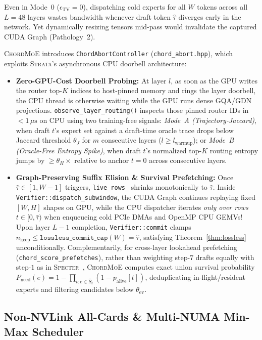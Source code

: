 \documentclass[10pt,twocolumn]{article}
\theoremstyle{definition}
\begin{document}
Even in Mode~0 ($\epsilon_{\mathrm{TV}} = 0$), dispatching cold experts for all $W$ tokens across all $L=48$ layers wastes bandwidth whenever draft token $\hat{\tau}$ diverges early in the network. Yet dynamically resizing tensors mid-pass would invalidate the captured CUDA Graph (Pathology~2).

\textsc{ChordMoE} introduces \texttt{ChordAbortController} (\texttt{chord\_abort.hpp}), which exploits \textsc{Strata}'s asynchronous CPU doorbell architecture:
\begin{itemize}
  \item \textbf{Zero-GPU-Cost Doorbell Probing:} At layer $l$, as soon as the GPU writes the router top-$K$ indices to host-pinned memory and rings the layer doorbell, the CPU thread is otherwise waiting while the GPU runs dense GQA/GDN projections. \texttt{observe\_layer\_routing()} inspects those pinned router IDs in $<\!1\,\mu\text{s}$ on CPU using two training-free signals: \emph{Mode~A (Trajectory-Jaccard)}, when draft $t$'s expert set against a draft-time oracle trace drops below Jaccard threshold $\theta_J$ for $m$ consecutive layers ($l \ge l_{\text{warmup}}$); or \emph{Mode~B (Oracle-Free Entropy Spike)}, when draft $t$'s normalized top-$K$ routing entropy jumps by $\ge \theta_H \times$ relative to anchor $t=0$ across consecutive layers.
  \item \textbf{Graph-Preserving Suffix Elision \& Survival Prefetching:} Once $\hat{\tau} \in [1, W-1]$ triggers, \texttt{live\_rows\_} shrinks monotonically to $\hat{\tau}$. Inside \texttt{Verifier::dispatch\_subwindow}, the CUDA Graph continues replaying fixed $[W, H]$ shapes on GPU, while the CPU dispatcher iterates \emph{only over rows $t \in [0, \hat{\tau})$} when enqueueing cold PCIe DMAs and OpenMP CPU GEMVs! Upon layer $L-1$ completion, \texttt{Verifier::commit} clamps $n_{\text{keep}} \le \texttt{lossless\_commit\_cap}(W) = \hat{\tau}$, satisfying Theorem~\ref{thm:lossless} unconditionally. Complementarily, for cross-layer lookahead prefetching (\texttt{chord\_score\_prefetches}), rather than weighting step-$7$ drafts equally with step-$1$ as in \textsc{Specter}~\cite{specter2026}, \textsc{ChordMoE} computes exact union survival probability $P_{\mathrm{need}}(e) = 1 - \prod_{t: e \in \hat{S}_t}(1 - p_{\mathrm{alive}}[t])$, deduplicating in-flight/resident experts and filtering candidates below $\theta_{\mathrm{ev}}$.
\end{itemize}

\subsection{Non-NVLink All-Cards \& Multi-NUMA Min-Max Scheduler}
\label{sec:sched}
\end{document}

